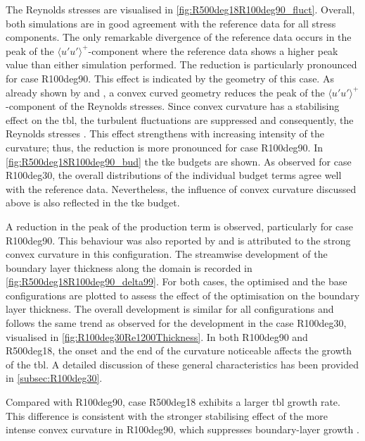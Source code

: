  The Reynolds stresses are visualised in  \autoref{fig:R500deg18R100deg90_fluct}.
Overall, both simulations are in good agreement with the reference data for all stress components. 
The only remarkable divergence of the reference data occurs in the peak of the $\langle u'u' \rangle^+$-component
where the reference data shows a higher peak value than either  simulation performed.
 The reduction is particularly pronounced for case  R100deg90. 
This effect is indicated by the geometry of this case.
As already shown by \citet{so_experiment_1973} and \cite{schwarz_convex_1996}, a convex curved geometry reduces the peak of the $\langle u'u' \rangle^+$-component of the Reynolds stresses. 
Since convex curvature has a stabilising effect on the \acrshort{tbl}, the turbulent fluctuations are suppressed  and consequently, the Reynolds stresses \citet{yang_assessment_2016}.
This effect strengthens with increasing intensity of the curvature; thus,  the reduction is more pronounced for  case  R100deg90.
In \autoref{fig:R500deg18R100deg90_bud} the \acrshort{tke} budgets are shown.
As observed for case R100deg30,  the overall distributions of the individual budget terms agree well with the reference data. 
Nevertheless, the influence of convex curvature discussed above is also reflected in the \acrshort{tke} budget.


A reduction in the peak of the production term is observed, particularly for case R100deg90. This behaviour was also reported  by \citet{gillis_turbulent_1983} and  is attributed to the strong convex curvature in this configuration.
The streamwise development of the boundary layer thickness along the domain is recorded in \autoref{fig:R500deg18R100deg90_delta99}.
For both cases, the optimised and the base configurations are plotted to assess the effect of the optimisation on the boundary layer thickness.
The overall development is similar for all configurations and follows the same trend as observed for the development in the case R100deg30, visualised in \autoref{fig:R100deg30Re1200Thickness}.
In both  R100deg90 and R500deg18, the onset and the end of the curvature noticeable affects the growth of the \acrshort{tbl}.
A detailed discussion of these general characteristics has been provided in  \autoref{subsec:R100deg30}.

Compared with R100deg90,  case R500deg18 exhibits  a larger \acrshort{tbl} growth rate. This difference is consistent with the stronger stabilising effect of the more intense convex curvature in R100deg90, which suppresses boundary-layer growth \citep{gillis_turbulent_1983,so_experiment_1973}.

